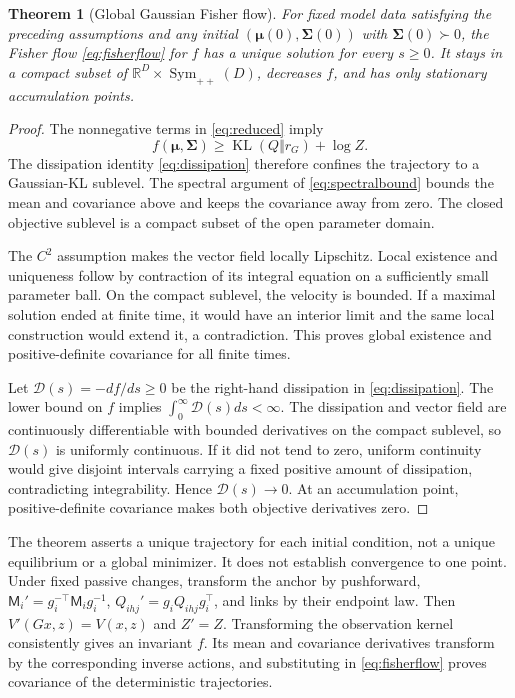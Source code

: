 \documentclass[11pt]{article}
\newtheorem{theorem}{Theorem}[section]
\newcommand{\KL}{\operatorname{KL}}
\newcommand{\R}{\mathbb R}
\newcommand{\SPD}{\operatorname{Sym}_{++}}
\newcommand{\m}{\boldsymbol{\mu}}
\newcommand{\Sig}{\boldsymbol{\Sigma}}
\begin{document}
\begin{theorem}[Global Gaussian Fisher flow]
\label{thm:global}
For fixed model data satisfying the preceding assumptions and any initial $(\m(0),\Sig(0))$ with $\Sig(0)\succ0$, the Fisher flow \eqref{eq:fisherflow} for $f$ has a unique solution for every $s\ge0$. It stays in a compact subset of $\R^D\times\SPD(D)$, decreases $f$, and has only stationary accumulation points.
\end{theorem}
\begin{proof}
The nonnegative terms in \eqref{eq:reduced} imply
\begin{equation}
f(\m,\Sig)\ge\KL(Q\Vert r_G)+\log Z.
\label{eq:coercivity}
\end{equation}
The dissipation identity \eqref{eq:dissipation} therefore confines the trajectory to a Gaussian-KL sublevel. The spectral argument of \eqref{eq:spectralbound} bounds the mean and covariance above and keeps the covariance away from zero. The closed objective sublevel is a compact subset of the open parameter domain.

The $C^2$ assumption makes the vector field locally Lipschitz. Local existence and uniqueness follow by contraction of its integral equation on a sufficiently small parameter ball. On the compact sublevel, the velocity is bounded. If a maximal solution ended at finite time, it would have an interior limit and the same local construction would extend it, a contradiction. This proves global existence and positive-definite covariance for all finite times.

Let $\mathcal D(s)=-df/ds\ge0$ be the right-hand dissipation in \eqref{eq:dissipation}. The lower bound on $f$ implies $\int_0^\infty\mathcal D(s)ds<\infty$. The dissipation and vector field are continuously differentiable with bounded derivatives on the compact sublevel, so $\mathcal D(s)$ is uniformly continuous. If it did not tend to zero, uniform continuity would give disjoint intervals carrying a fixed positive amount of dissipation, contradicting integrability. Hence $\mathcal D(s)\to0$. At an accumulation point, positive-definite covariance makes both objective derivatives zero.
\end{proof}

The theorem asserts a unique trajectory for each initial condition, not a unique equilibrium or a global minimizer. It does not establish convergence to one point. Under fixed passive changes, transform the anchor by pushforward, $\mathsf M_i'=g_i^{-\top}\mathsf M_i g_i^{-1}$, $Q_{ihj}'=g_iQ_{ihj}g_i^\top$, and links by their endpoint law. Then $V'(Gx,z)=V(x,z)$ and $Z'=Z$. Transforming the observation kernel consistently gives an invariant $f$. Its mean and covariance derivatives transform by the corresponding inverse actions, and substituting in \eqref{eq:fisherflow} proves covariance of the deterministic trajectories.
\end{document}
